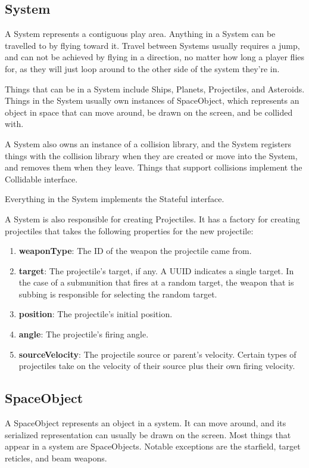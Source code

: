 \documentclass{article}
\begin{document}
\subsection{System}
A System represents a contiguous play area. Anything in a System can be travelled to by flying toward it. Travel between Systems usually requires a jump, and can not be achieved by flying in a direction, no matter how long a player flies for, as they will just loop around to the other side of the system they're in.

Things that can be in a System include Ships, Planets, Projectiles, and Asteroids. Things in the System usually own instances of SpaceObject, which represents an object in space that can move around, be drawn on the screen, and be collided with. 

A System also owns an instance of a collision library, and the System registers things with the collision library when they are created or move into the System, and removes them when they leave. Things that support collisions implement the Collidable interface.

Everything in the System implements the Stateful interface.

A System is also responsible for creating Projectiles. It has a factory for creating projectiles that takes the following properties for the new projectile:
\begin{enumerate}
\item[] \textbf{weaponType}: The ID of the weapon the projectile came from.
\item[] \textbf{target}: The projectile's target, if any. A UUID indicates a single target. In the case of a submunition that fires at a random target, the weapon that is subbing is responsible for selecting the random target.
\item[] \textbf{position}: The projectile's initial position.
\item[] \textbf{angle}: The projectile's firing angle.
\item[] \textbf{sourceVelocity}: The projectile source or parent's velocity. Certain types of projectiles take on the velocity of their source plus their own firing velocity.
\end{enumerate}

\subsection{SpaceObject}
A SpaceObject represents an object in a system. It can move around, and its serialized representation can usually be drawn on the screen. Most things that appear in a system are SpaceObjects. Notable exceptions are the starfield, target reticles, and beam weapons.
 
\end{document}
